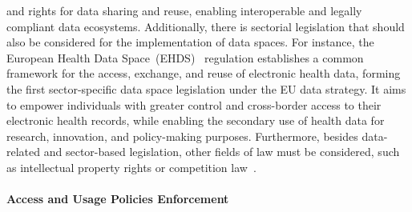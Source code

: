 and rights for data sharing and reuse,
enabling interoperable and legally compliant data ecosystems.
Additionally,
there is sectorial legislation
that should also be considered for the
implementation of data spaces.
For instance,
the European Health Data Space~(EHDS)~\cite{ehds} regulation
establishes a common framework for the access,
exchange, and reuse of electronic health data,
forming the first sector-specific data space legislation
under the EU data strategy.
It aims to empower individuals with greater control and
cross-border access to their electronic health records,
while enabling the secondary use of health data for research,
innovation, and policy-making purposes.
Furthermore,
besides data-related and sector-based legislation,
other fields of law must be considered,
such as intellectual property rights or
competition law~\cite{data_spaces_support_centre_summary_2026}.

\paragraph{Access and Usage Policies Enforcement}

